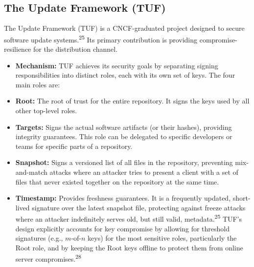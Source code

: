 \documentclass{article}
\begin{document}
\subsection{The Update Framework (TUF)}

The Update Framework (TUF) is a CNCF-graduated project designed to secure software update systems.\textsuperscript{25} Its primary contribution is providing compromise-resilience for the distribution channel.

\begin{itemize}
\item \textbf{Mechanism:} TUF achieves its security goals by separating signing responsibilities into distinct roles, each with its own set of keys. The four main roles are:
\end{itemize}

\begin{itemize}
\item \textbf{Root:} The root of trust for the entire repository. It signs the keys used by all other top-level roles.
\item \textbf{Targets:} Signs the actual software artifacts (or their hashes), providing integrity guarantees. This role can be delegated to specific developers or teams for specific parts of a repository.
\item \textbf{Snapshot:} Signs a versioned list of all files in the repository, preventing mix-and-match attacks where an attacker tries to present a client with a set of files that never existed together on the repository at the same time.
\item \textbf{Timestamp:} Provides freshness guarantees. It is a frequently updated, short-lived signature over the latest snapshot file, protecting against freeze attacks where an attacker indefinitely serves old, but still valid, metadata.\textsuperscript{25} TUF's design explicitly accounts for key compromise by allowing for threshold signatures (e.g., $m$-of-$n$ keys) for the most sensitive roles, particularly the Root role, and by keeping the Root keys offline to protect them from online server compromises.\textsuperscript{28}
\end{itemize}
\end{document}
